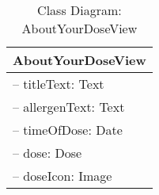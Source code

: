 \begin{table}[H]
\centering
\caption{Class Diagram: AboutYourDoseView}

\hspace{1em}
\renewcommand{\arraystretch}{1.7}

\begin{tabular}{|l|}
\hline
\textbf{AboutYourDoseView} \\
\hline
– titleText: Text \\
– allergenText: Text \\
– timeOfDose: Date \\
– dose: Dose \\
– doseIcon: Image \\
\hline
\end{tabular}
\end{table}
